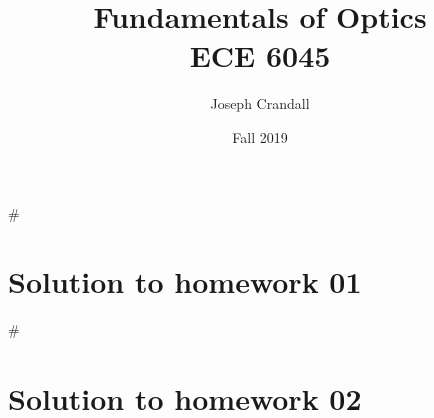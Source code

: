 

\usepackage{subfiles}
\usepackage{color,soul}
\usepackage{siunitx}

\title{Fundamentals of Optics\\
\large ECE 6045}
\author{Joseph Crandall}
\date{Fall 2019}


\maketitle

#\section{Solution to homework 01}
#

\section{Solution to homework 02}


%

%

%


%


